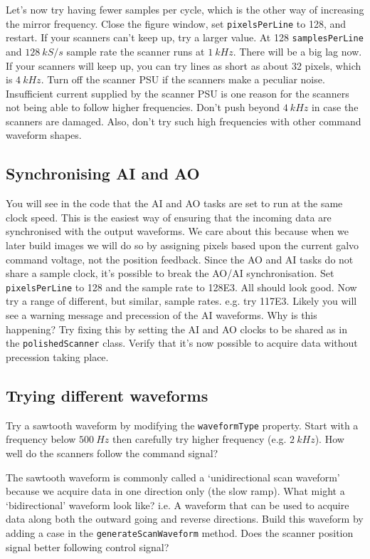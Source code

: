 \documentclass[a4paper]{report}
\begin{document}
Let's now try having fewer samples per cycle, which is the other way of increasing the mirror frequency. 
Close the figure window, set \texttt{pixelsPerLine} to 128, and restart.
If your scanners can't keep up, try a larger value. 
At 128 \texttt{samplesPerLine} and $128~kS/s$ sample rate the scanner runs at $1~kHz$. 
There will be a big lag now. 
If your scanners will keep up, you can try lines as short as about 32 pixels, which is $4~kHz$. 
Turn off the scanner PSU if the scanners make a peculiar noise. 
Insufficient current supplied by the scanner PSU is one reason for the scanners not being able to follow higher frequencies.
Don't push beyond $4~kHz$ in case the scanners are damaged.
Also, don't try such high frequencies with other command waveform shapes.



\subsection{Synchronising AI and AO}
You will see in the code that the AI and AO tasks are set to run at the same clock speed. 
This is the easiest way of ensuring that the incoming data are synchronised with the output waveforms. 
We care about this because when we later build images we will do so by assigning pixels based upon the current galvo command voltage, not the position feedback.
Since the AO and AI tasks do not share a sample clock, it's possible to break the AO/AI synchronisation. 
Set \texttt{pixelsPerLine} to 128 and the sample rate to 128E3. 
All should look good. 
Now try a range of different, but similar, sample rates. e.g. try 117E3. 
Likely you will see a warning message and precession of the AI waveforms. 
Why is this happening?
Try fixing this by setting the AI and AO clocks to be shared as in the \texttt{polishedScanner} class. 
Verify that it's now possible to acquire data without precession taking place.


\subsection{Trying different waveforms}
Try a sawtooth waveform by modifying the \texttt{waveformType} property. 
Start with a frequency below $500~Hz$ then carefully try higher frequency (e.g. $2~kHz$). 
How well do the scanners follow the command signal?

The sawtooth waveform is commonly called a `unidirectional scan waveform' because we acquire data in one direction only (the slow ramp). 
What might a `bidirectional' waveform look like? i.e. A waveform that can be used to acquire data along both the outward going and reverse directions. 
Build this waveform by adding a case in the \texttt{generateScanWaveform} method. 
Does the scanner position signal better following control signal?
\end{document}
